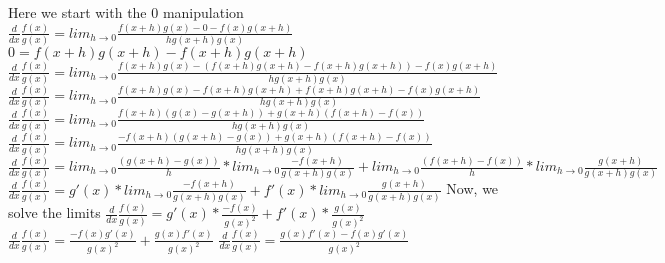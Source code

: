 \documentclass{article}
\begin{document}
\newline
\newline
Here we start with the $0$ manipulation
\newline
\newline
$\frac{d}{dx}\frac{f(x)}{g(x)} = lim_{h\to 0} \frac{f(x+h)g(x) - 0 - f(x)g(x+h)}{hg(x+h)g(x)}$
\newline
\newline
$0 = f(x+h)g(x+h) - f(x+h)g(x+h)$
\newline
\newline
$\frac{d}{dx}\frac{f(x)}{g(x)} = lim_{h\to 0} \frac{f(x+h)g(x) - (f(x+h)g(x+h) - f(x+h)g(x+h)) - f(x)g(x+h)}{hg(x+h)g(x)}$
\newline
\newline
$\frac{d}{dx}\frac{f(x)}{g(x)} = lim_{h\to 0} \frac{f(x+h)g(x) - f(x+h)g(x+h) + f(x+h)g(x+h) - f(x)g(x+h)}{hg(x+h)g(x)}$
\newline
\newline
$\frac{d}{dx}\frac{f(x)}{g(x)} = lim_{h\to 0} \frac{f(x+h)(g(x) - g(x+h)) + g(x+h)(f(x+h) - f(x))}{hg(x+h)g(x)}$
\newline
\newline
$\frac{d}{dx}\frac{f(x)}{g(x)} = lim_{h\to 0} \frac{-f(x+h)(g(x+h) - g(x)) + g(x+h)(f(x+h) - f(x))}{hg(x+h)g(x)}$
\newline
\newline
$\frac{d}{dx}\frac{f(x)}{g(x)} = lim_{h\to 0} \frac{(g(x+h) - g(x))}{h} * lim_{h\to 0} \frac{-f(x+h)}{g(x+h)g(x)} + lim_{h\to 0} \frac{(f(x+h) - f(x))}{h} * lim_{h\to 0} \frac{g(x+h)}{g(x+h)g(x)}$
\newline
\newline
$\frac{d}{dx}\frac{f(x)}{g(x)} = g'(x) * lim_{h\to 0} \frac{-f(x+h)}{g(x+h)g(x)} + f'(x) * lim_{h\to 0} \frac{g(x+h)}{g(x+h)g(x)}$
\newline
\newline
Now, we solve the limits
\newline
\newline
$\frac{d}{dx}\frac{f(x)}{g(x)} = g'(x) *  \frac{-f(x)}{g(x)^2} + f'(x) * \frac{g(x)}{g(x)^2}$
\newline
\newline
$\frac{d}{dx}\frac{f(x)}{g(x)} = \frac{-f(x)g'(x)}{g(x)^2} + \frac{g(x)f'(x)}{g(x)^2}$
\newline
\newline
$\frac{d}{dx}\frac{f(x)}{g(x)} = \frac{g(x)f'(x)-f(x)g'(x)}{g(x)^2}$
\newline
\newline
\end{document}
